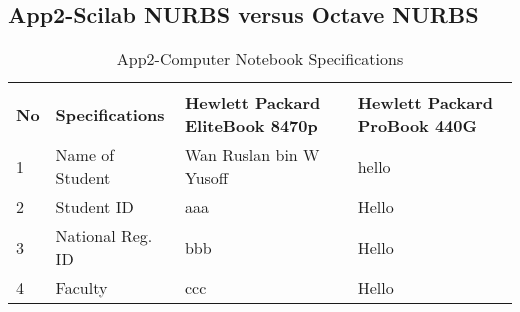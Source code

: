 \clearpage
\begin{landscape}
	\subsection{App2-Scilab NURBS versus Octave NURBS}
	
	\begin{table}[ht]
		\begin{center}
			\caption{App2-Computer Notebook Specifications}		
			\label{tabl2:App2-Computer Notebook Specifications}	
			
			\begin{tabular}{ |p{0.5cm}|p{5.0cm}|p{9.0cm}|p{9.0cm}|}
				\rowcolor{gray!10}			
				\hline \multicolumn{4}{|c|}{\textbf{Computer Notebook Specifications}} \\ [1.0ex]
				\rowcolor{gray!10}
				\hline \textbf{No} & \textbf{Specifications}    & \textbf{Hewlett Packard EliteBook 8470p} & \textbf{Hewlett Packard ProBook 440G}\\ 
				
				\hline 1 & Name of Student    & Wan Ruslan bin W Yusoff & hello\\ 
				\hline 2 & Student ID         &  aaa & Hello\\ 
				\hline 3 & National Reg. ID   & bbb  & Hello\\ 
				\hline 4 & Faculty            & ccc  & Hello\\ 
				
				\hline
			\end{tabular}
		\end{center}
	\end{table}  
	
	
\end{landscape}

